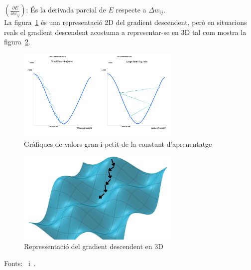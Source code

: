            $\left( \frac{\partial E}{\partial w_{ij}} \right)$: És la derivada parcial de $E$ respecte a $\Delta w_{ij}$. \\

           La figura~\ref{Gran i petit} és una representació 2D del gradient descendent, però en situacions reals el gradient descendent acostuma a representar-se en 3D tal com mostra la figura~\ref{f:gradient3D}.

    \begin{figure}[H]
    \centering
    \includegraphics[width=0.7\textwidth]{./figures/constant_gradient.png}
        \caption{Gràfiques de valors gran i petit de la constant d'aprenentatge}
        \label{Gran i petit}
    \end{figure}

    \begin{figure}[H]
    \centering
    \includegraphics[width=0.7\textwidth]{./figures/gradient_descendent3d.png}
    \caption{Repressentació del gradient descendent en 3D}
    \label{f:gradient3D}
    \end{figure}


\bigskip

Fonts:~\cite{IBM_Gradient} i~\cite{Video_Gradient}.

